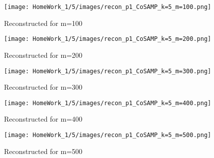 \documentclass{article}
\begin{document}
\begin{figure}[h!]
    \centering
    \begin{minipage}{0.1\textwidth}
        \texttt{[image: HomeWork\_1/5/images/recon\_p1\_CoSAMP\_k=5\_m=100.png]}
        \caption{Reconstructed for m=100}
    \end{minipage}
    \hspace{0.5cm}
    \begin{minipage}{0.1\textwidth}
        \centering
        \texttt{[image: HomeWork\_1/5/images/recon\_p1\_CoSAMP\_k=5\_m=200.png]}
        \caption{Reconstructed for m=200}
    \end{minipage}
    \hspace{0.5cm}
    \begin{minipage}{0.1\textwidth}
        \centering
        \texttt{[image: HomeWork\_1/5/images/recon\_p1\_CoSAMP\_k=5\_m=300.png]}
        \caption{Reconstructed for m=300}
    \end{minipage}
    \hspace{0.5cm}
    \begin{minipage}{0.1\textwidth}
        \centering
        \texttt{[image: HomeWork\_1/5/images/recon\_p1\_CoSAMP\_k=5\_m=400.png]}
        \caption{Reconstructed for m=400}
    \end{minipage}
    \hspace{0.5cm}
    \begin{minipage}{0.1\textwidth}
        \centering
        \texttt{[image: HomeWork\_1/5/images/recon\_p1\_CoSAMP\_k=5\_m=500.png]}
        \caption{Reconstructed for m=500}
    \end{minipage}

    \vspace{1cm} %


\end{figure}
\end{document}
